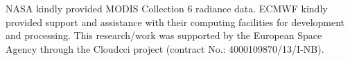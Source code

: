 \begin{acknowledgements}
NASA kindly provided MODIS Collection 6 radiance data. ECMWF kindly provided support and assistance with their computing facilities for development and processing.
This research/work was supported by the European Space Agency through the Cloud\textunderscore cci project (contract No.: 4000109870/13/I-NB).
\end{acknowledgements}

